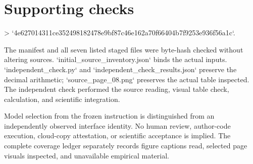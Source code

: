 \documentclass[10pt]{article}
\begin{document}
\section*{Supporting checks}
> `4e627014311ce352498182478e9bf87c46e162a70f66404b7f9253e936f56a1c`.\par
The manifest and all seven listed staged files were byte-hash checked without altering sources. `initial\_source\_inventory.json` binds the actual inputs. `independent\_check.py` and `independent\_check\_results.json` preserve the decimal arithmetic; `source\_page\_08.png` preserves the actual table inspected. The independent check performed the source reading, visual table check, calculation, and scientific integration.\par
Model selection from the frozen instruction is distinguished from an independently observed interface identity. No human review, author-code execution, cloud-copy attestation, or scientific acceptance is implied. The complete coverage ledger separately records figure captions read, selected page visuals inspected, and unavailable empirical material.\par
\end{document}
